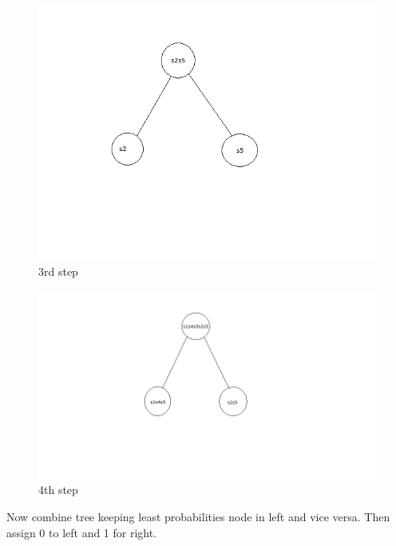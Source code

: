 \documentclass[10pt,a4paper]{article}
\begin{document}
\begin{figure}[H]
	\includegraphics[scale=0.9]{eg3}
	\caption{3rd step}
	\label{huffman3}
\end{figure}
\hfill
\begin{figure}[H]
	\includegraphics[scale=0.9]{eg4}
	\caption{4th step} 
	\label{huffman4}
\end{figure}
\hfill
Now combine tree keeping least probabilities node in left and vice versa. Then assign 0 to left and 1 for right.
\end{document}

